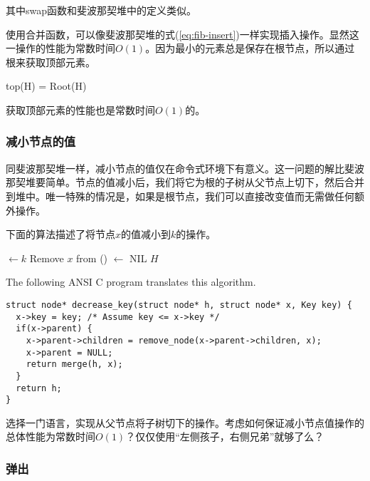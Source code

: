 \documentclass[UTF8]{article}
\begin{document}
其中swap函数和斐波那契堆中的定义类似。

使用合并函数，可以像斐波那契堆的式(\ref{eq:fib-insert})一样实现插入操作。显然这一操作的性能为常数时间$O(1)$。因为最小的元素总是保存在根节点，所以通过根来获取顶部元素。

\be
top(H) = Root(H)
\ee

获取顶部元素的性能也是常数时间$O(1)$的。

\subsubsection{减小节点的值}

同斐波那契堆一样，减小节点的值仅在命令式环境下有意义。这一问题的解比斐波那契堆要简单。节点的值减小后，我们将它为根的子树从父节点上切下，然后合并到堆中。唯一特殊的情况是，如果是根节点，我们可以直接改变值而无需做任何额外操作。

下面的算法描述了将节点$x$的值减小到$k$的操作。

\begin{algorithmic}[1]
  \State {} $\gets k$
    \State Remove $x$ from ()
     $\gets$ NIL
    \State \Return {}
  \EndIf
  \State \Return $H$
\EndFunction
\end{algorithmic}

The following ANSI C program translates this algorithm.

\lstset{language=C}
\begin{lstlisting}
struct node* decrease_key(struct node* h, struct node* x, Key key) {
  x->key = key; /* Assume key <= x->key */
  if(x->parent) {
    x->parent->children = remove_node(x->parent->children, x);
    x->parent = NULL;
    return merge(h, x);
  }
  return h;
}
\end{lstlisting}

\begin{Exercise}
选择一门语言，实现从父节点将子树切下的操作。考虑如何保证减小节点值操作的总体性能为常数时间$O(1)$？仅仅使用“左侧孩子，右侧兄弟”就够了么？
\end{Exercise}

\subsubsection{弹出}
 
\end{document}
